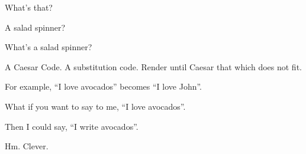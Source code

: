 

What's that? 

A salad spinner?

What's a salad spinner?

A Caesar Code.  A substitution code.  Render until Caesar that which
does not fit.

For example, ``I love avocados'' becomes ``I love John''.

What if you want to say to me, ``I love avocados''. 

Then I could say, ``I write avocados''.

Hm.  Clever.

\bye
